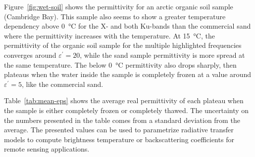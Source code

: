Figure~\ref{fig:wet-soil} shows the permittivity for an arctic organic soil sample (Cambridge Bay).
This sample also seems to show a greater temperature dependency above \qty{0}{\degreeCelsius} for the X- and both Ku-bands than the commercial sand where the permittivity increases with the temperature.
At \qty{15}{\degreeCelsius}, the permittivity of the organic soil sample for the multiple highlighted frequencies converges around \(\varepsilon^\prime = 20\), while the sand sample permittivity is more spread at the same temperature.
The below \qty{0}{\degreeCelsius} permittivity also drops sharply, then plateaus when the water inside the sample is completely frozen at a value around \(\varepsilon^\prime = 5\), like the commercial sand.

Table~\ref{tab:mean-eps} shows the average real permittivity of each plateau when the sample is either completely frozen or completely thawed.
The uncertainty on the numbers presented in the table comes from a standard deviation from the average.
The presented values can be used to parametrize radiative transfer models to compute brightness temperature or backscattering coefficients for remote sensing applications.

\begin{table}[ht!]
\centering
\caption{Mean real permittivity of the frozen (T\(\leq\)\qty{-0.5}{\degreeCelsius}) and thawed (T\(\geq\)\qty{0.5}{\degreeCelsius}) sample for each relevant band frequencies}\label{tab:mean-eps}%
\end{table}

